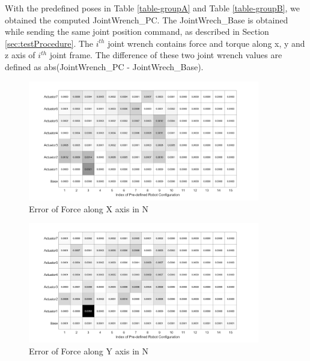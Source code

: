 
With the predefined poses in Table \ref{table-groupA} and Table \ref{table-groupB}, we obtained the computed JointWrench\_PC. The JointWrech\_Base is obtained while sending the same joint position command, as described in Section \ref{sec:testProcedure}. The $i^{th}$ joint wrench contains force and torque along x, y and z axis of $i^{th}$ joint frame. The difference of these two joint wrench values are defined as abs(JointWrench\_PC - JointWrech\_Base). 

\begin{figure}[H]
	\begin{center}
		\includegraphics[width=0.9\textwidth]{./images/ForceXError.png}%
		\caption{Error of Force along X axis in N}
		\label{fig:ForceXError}%
	\end{center}
\end{figure}

\begin{figure}[H]
	\begin{center}
		\includegraphics[width=0.9\textwidth]{./images/ForceYError.png}%
		\caption{Error of Force along Y axis in N}
		\label{fig:ForceYError}%
	\end{center}
\end{figure}

